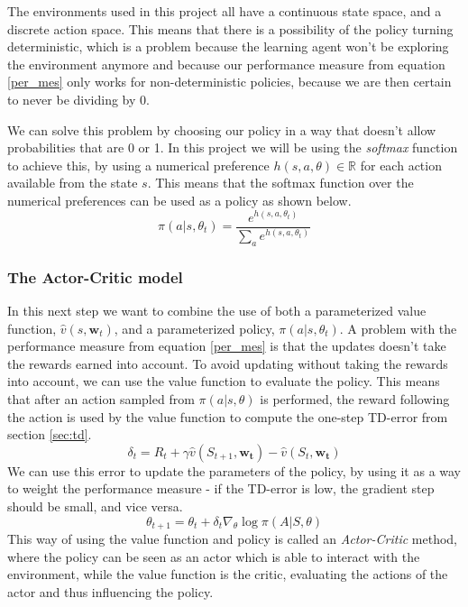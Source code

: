 \documentclass[11pt]{article}
\begin{document}
The environments used in this project all have a continuous state space,
and a discrete action space.
This means that there is a possibility of the policy turning deterministic,
which is a problem because the learning agent won't be exploring the environment anymore
and because our performance measure from equation \ref{per_mes} only works for
non-deterministic policies, because we are then certain to never be dividing by 0.

We can solve this problem by choosing our policy in a way that doesn't allow probabilities that are 0 or 1.
In this project we will be using the \textit{softmax} function to achieve this,
by using a numerical preference $h(s, a, \theta) \in \mathbb{R}$
for each action available from the state $s$.
This means that the softmax function over the numerical preferences can be used as a policy
as shown below. 
\begin{equation}\label{eq:soft_max}
    \pi(a | s, \theta_t) = \frac{e^{h(s,a,\theta_t)}}{\sum\limits_{a} e^{h(s,a,\theta_t)}}
\end{equation}

\subsubsection{The Actor-Critic model}\label{sec:actor_critic}

In this next step we want to combine the use of both a parameterized value function, $\hat{v}(s, \mathbf{w}_t)$,
and a parameterized policy, $\pi(a|s, \theta_t)$.
A problem with the performance measure from equation \ref{per_mes} is that
the updates doesn't take the rewards earned into account. 
To avoid updating without taking the rewards into account, we can
use the value function to evaluate the policy.
This means that after an action sampled from $\pi(a|s,\theta)$ is performed,
the reward following the action is used by the value function to
compute the one-step TD-error from section \ref{sec:td}.
\begin{equation*}
    \delta_t =  R_t + \gamma \hat{v} (S_{t+1}, \mathbf{w_t}) - \hat{v}(S_t, \mathbf{w_t})
\end{equation*}
We can use this error to update the parameters of the policy,
by using it as a way to weight the performance measure - if the TD-error is low,
the gradient step should be small, and vice versa.
\begin{equation}\label{eq:ac_theta}
    \theta_{t+1} = \theta_t + \delta_t \nabla_{\theta} \log \pi(A | S, \theta)
\end{equation}
This way of using the value function and policy is called an
\textit{Actor-Critic} method, where the policy can be seen as an actor
which is able to interact with the environment, while the value function
is the critic, evaluating the actions of the actor and thus
influencing the policy.
\end{document}

